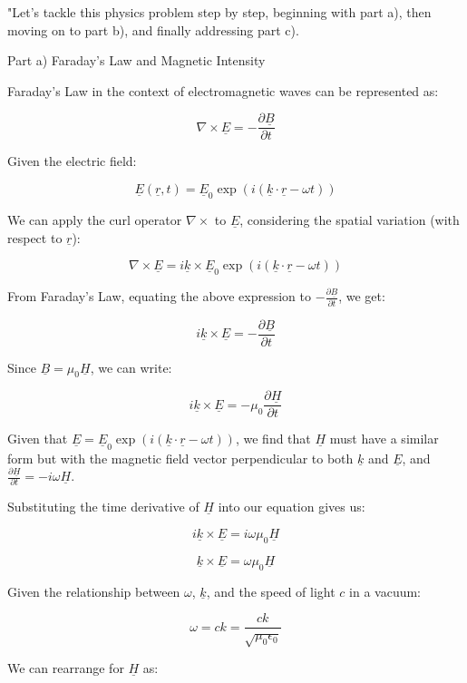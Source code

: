 "Let's tackle this physics problem step by step, beginning with part a), then moving on to part b), and finally addressing part c).

Part a) Faraday’s Law and Magnetic Intensity

Faraday's Law in the context of electromagnetic waves can be represented as:

\[
\nabla \times \underline{E} = -\frac{\partial \underline{B}}{\partial t}
\]

Given the electric field:

\[
\underline{E}(\underline{r}, t) = \underline{E}_{0} \exp (i(\underline{k} \cdot \underline{r} - \omega t))
\]

We can apply the curl operator \(\nabla \times\) to \(\underline{E}\), considering the spatial variation (with respect to \(\underline{r}\)):

\[
\nabla \times \underline{E} = i\underline{k} \times \underline{E}_{0} \exp (i(\underline{k} \cdot \underline{r} - \omega t))
\]

From Faraday's Law, equating the above expression to \(-\frac{\partial \underline{B}}{\partial t}\), we get:

\[
i\underline{k} \times \underline{E} = -\frac{\partial \underline{B}}{\partial t}
\]

Since \(\underline{B} = \mu_{0} \underline{H}\), we can write:

\[
i\underline{k} \times \underline{E} = -\mu_{0} \frac{\partial \underline{H}}{\partial t}
\]

Given that \(\underline{E} = \underline{E}_{0} \exp (i(\underline{k} \cdot \underline{r} - \omega t))\), we find that \(\underline{H}\) must have a similar form but with the magnetic field vector perpendicular to both \(\underline{k}\) and \(\underline{E}\), and \(\frac{\partial \underline{H}}{\partial t} = -i\omega \underline{H}\).

Substituting the time derivative of \(\underline{H}\) into our equation gives us:

\[
i\underline{k} \times \underline{E} = i\omega\mu_{0} \underline{H}
\]

\[
\underline{k} \times \underline{E} = \omega\mu_{0} \underline{H}
\]

Given the relationship between \(\omega\), \(\underline{k}\), and the speed of light \(c\) in a vacuum:

\[
\omega = ck = \frac{ck}{\sqrt{\mu_{0}\epsilon_{0}}}
\]

We can rearrange for \(\underline{H}\) as:

